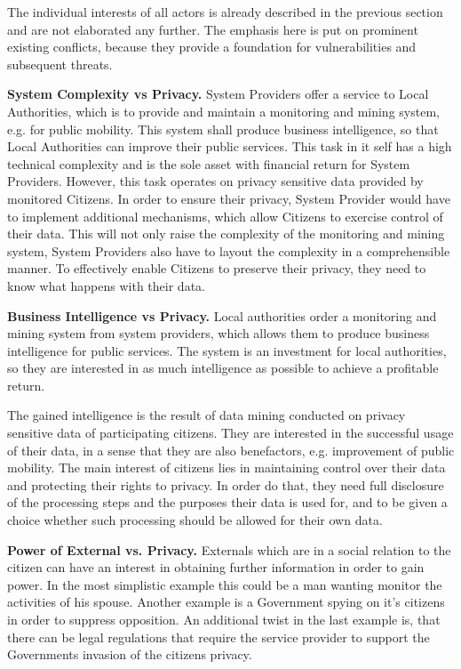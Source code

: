 The individual interests of all actors is already described in the previous section and are not elaborated any further.
The emphasis here is put on prominent existing conflicts, because they provide a foundation for vulnerabilities and subsequent threats.



\textbf{System Complexity vs Privacy.}
System Providers offer a service to Local Authorities, which is to provide and maintain a monitoring and mining system, e.g. for public mobility.
This system shall produce business intelligence, so that Local Authorities can improve their public services.
This task in it self has a high technical complexity and is the sole asset with financial return for System Providers.
However, this task operates on privacy sensitive data provided by monitored Citizens.
In order to ensure their privacy, System Provider would have to implement additional mechanisms, which allow Citizens to exercise control of their data.
This will not only raise the complexity of the monitoring and mining system, System Providers also have to layout the complexity in a comprehensible manner.
To effectively enable Citizens to preserve their privacy, they need to know what happens with their data.

\textbf{Business Intelligence vs Privacy.}
Local authorities order a monitoring and mining system from system providers, which allows them to produce business intelligence for public services.
The system is an investment for local authorities, so they are interested in as much intelligence as possible to achieve a profitable return.

The gained intelligence is the result of data mining conducted on privacy sensitive data of participating citizens.
They are interested in the successful usage of their data, in a sense that they are also benefactors, e.g. improvement of public mobility.
The main interest of citizens lies in maintaining control over their data and protecting their rights to privacy.
In order do that, they need full disclosure of the processing steps and the purposes their data is used for, and to be given a choice whether such processing should be allowed for their own data.

\textbf{Power of External vs. Privacy.}
Externals which are in a social relation to the citizen can have an interest in obtaining further information in order to gain power.
In the most simplistic example this could be a man wanting monitor the activities of his spouse.
Another example is a Government spying on it's citizens in order to suppress opposition.
An additional twist in the last example is, that there can be legal regulations that require the service provider to support the Governments invasion of the citizens privacy.

